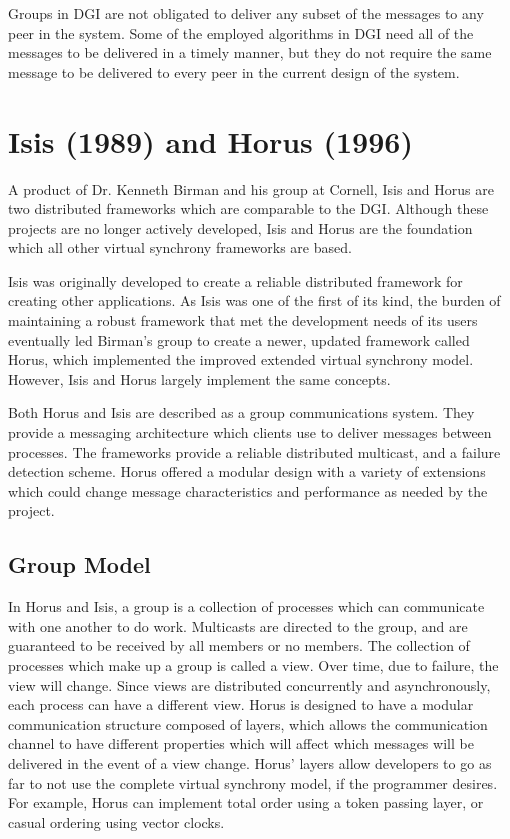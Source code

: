 Groups in DGI are not obligated to deliver any subset of the messages to any peer in the system. Some of the employed algorithms in DGI need all of the messages to be delivered in a timely manner, but they do not require the same message to be delivered to every peer in the current design of the system.

\section{Isis (1989) and Horus (1996)}

A product of Dr. Kenneth Birman and his group at Cornell, Isis \cite{ISISTOOLKIT} and Horus \cite{HORUSTOOLKIT} are two distributed frameworks which are comparable to the DGI. Although these projects are no longer actively developed, Isis and Horus are the foundation which all other virtual synchrony frameworks are based.

Isis was originally developed to create a reliable distributed framework for creating other applications. As Isis was one of the first of its kind, the burden of maintaining a robust framework that met the development needs of its users eventually led Birman's group to create a newer, updated framework called Horus, which implemented the improved extended virtual synchrony model. However, Isis and Horus largely implement the same concepts.

Both Horus and Isis are described as a group communications system. They provide a messaging architecture which clients use to deliver messages between processes. The frameworks provide a reliable distributed multicast, and a failure detection scheme. Horus offered a modular design with a variety of extensions which could change message characteristics and performance as needed by the project.

\subsection{Group Model}
In Horus and Isis, a group is a collection of processes which can communicate with one another to do work. Multicasts are directed to the group, and are guaranteed to be received by all members or no members. The collection of processes which make up a group is called a view.
Over time, due to failure, the view will change. Since views are distributed concurrently and asynchronously, each process can have a different view. Horus is designed to have a modular communication structure composed of layers, which allows the communication channel to have different properties which will affect which messages will be delivered in the event of a view change. Horus' layers allow developers to go as far to not use the complete virtual synchrony model, if the programmer desires. For example, Horus can implement total order using a token passing layer, or casual ordering using vector clocks.

